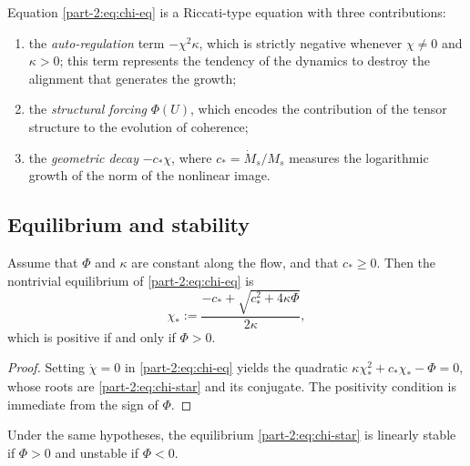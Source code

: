 \begin{remark}\label{part-2:rem:chi-structure}
Equation \eqref{part-2:eq:chi-eq} is a Riccati-type equation with three 
contributions:
\begin{enumerate}[label=(\roman*),leftmargin=*]
\item the \emph{auto-regulation} term $-\chi^2 \kappa$, which is 
      strictly negative whenever $\chi\neq 0$ and $\kappa>0$; this 
      term represents the tendency of the dynamics to destroy the 
      alignment that generates the growth;
\item the \emph{structural forcing} $\Phi(U)$, which encodes the 
      contribution of the tensor structure to the evolution of 
      coherence;
\item the \emph{geometric decay} $-c_\ast\chi$, where 
      $c_\ast = \dot M_s/M_s$ measures the logarithmic growth of the 
      norm of the nonlinear image.
\end{enumerate}
\end{remark}

\subsection{Equilibrium and stability}
\label{part-2:ssec:equilibrium}

\begin{proposition}[Equilibrium]\label{part-2:prop:equilibrium}
Assume that $\Phi$ and $\kappa$ are constant along the flow, and that 
$c_\ast \geq 0$. Then the nontrivial equilibrium of \eqref{part-2:eq:chi-eq} is
\begin{equation}\label{part-2:eq:chi-star}
\chi_\ast := \frac{-c_\ast + \sqrt{c_\ast^2 + 4\kappa\Phi}}{2\kappa},
\end{equation}
which is positive if and only if $\Phi>0$.
\end{proposition}

\begin{proof}
Setting $\dot\chi=0$ in \eqref{part-2:eq:chi-eq} yields the quadratic 
$\kappa\chi_\ast^2 + c_\ast\chi_\ast - \Phi = 0$, whose roots are 
\eqref{part-2:eq:chi-star} and its conjugate. The positivity condition is 
immediate from the sign of $\Phi$.
\end{proof}

\begin{proposition}\label{part-2:prop:stability}
Under the same hypotheses, the equilibrium \eqref{part-2:eq:chi-star} is 
linearly stable if $\Phi>0$ and unstable if $\Phi<0$.
\end{proposition}

